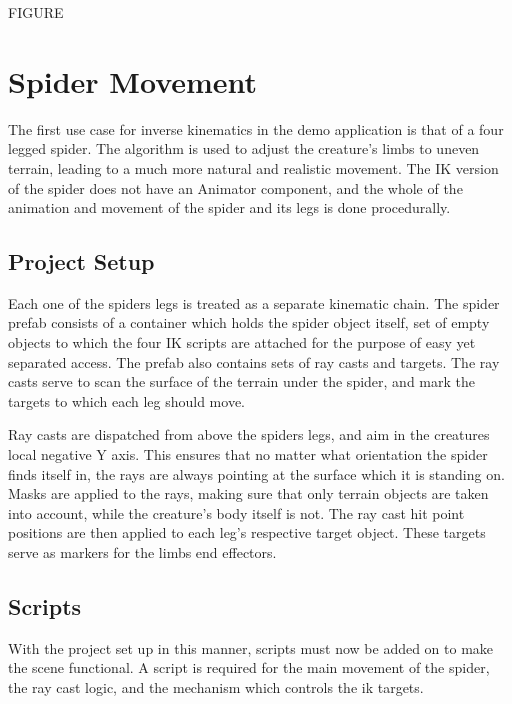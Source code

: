 FIGURE

\section{Spider Movement}
The first use case for inverse kinematics in the demo application is that of
a four legged spider. The algorithm is used to adjust the creature's limbs to
uneven terrain, leading to a much more natural and realistic movement. The IK
version of the spider does not have an Animator component, and the whole of the
animation and movement of the spider and its legs is done procedurally.
\subsection{Project Setup}
Each one of the spiders legs is treated as a separate kinematic chain. The
spider prefab consists of a container which holds the spider object itself, set
of empty objects to which the four IK scripts are attached for the purpose of
easy yet separated access. The prefab also contains sets of ray casts and
targets. The ray casts serve to scan the surface of the terrain under the
spider, and mark the targets to which each leg should move.

Ray casts are dispatched from above the spiders legs, and aim in the creatures
local negative Y axis. This ensures that no matter what orientation the spider
finds itself in, the rays are always pointing at the surface which it is
standing on. Masks are applied to the rays, making sure that only terrain
objects are taken into account, while the creature's body itself is not. The ray
cast hit point positions are then applied to each leg's respective target
object. These targets serve as markers for the limbs end effectors. 

\subsection{Scripts}
With the project set up in this manner, scripts must now be added on to make the
scene functional. A script is required for the main movement of the spider, the
ray cast logic, and the mechanism which controls the ik targets.

